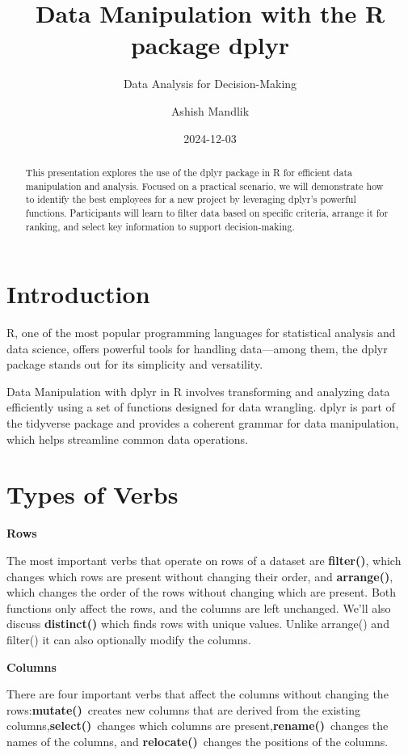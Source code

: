 \documentclass[
  11pt,
  a4paper]{article}
\title{Data Manipulation with the R package dplyr}
\subtitle{Data Analysis for Decision-Making}
\author{Ashish Mandlik}
\date{2024-12-03}
\begin{document}
\maketitle
\begin{abstract}
This presentation explores the use of the dplyr package in R for
efficient data manipulation and analysis. Focused on a practical
scenario, we will demonstrate how to identify the best employees for a
new project by leveraging dplyr's powerful functions. Participants will
learn to filter data based on specific criteria, arrange it for ranking,
and select key information to support decision-making.
\end{abstract}


\section{Introduction}\label{introduction}

R, one of the most popular programming languages for statistical
analysis and data science, offers powerful tools for handling
data---among them, the dplyr package stands out for its simplicity and
versatility.

Data Manipulation with dplyr in R involves transforming and analyzing
data efficiently using a set of functions designed for data wrangling.
dplyr is part of the tidyverse package and provides a coherent grammar
for data manipulation, which helps streamline common data operations.

\section{Types of Verbs}\label{types-of-verbs}

\textbf{Rows}

The most important verbs that operate on rows of a dataset are
\textbf{filter()}, which changes which rows are present without changing
their order, and \textbf{arrange()}, which changes the order of the rows
without changing which are present. Both functions only affect the rows,
and the columns are left unchanged. We'll also discuss
\textbf{distinct()} which finds rows with unique values. Unlike
arrange() and filter() it can also optionally modify the columns.

\textbf{Columns}

There are four important verbs that affect the columns without changing
the rows:\textbf{mutate()}~creates new columns that are derived from the
existing columns,\textbf{select()}~changes which columns are
present,\textbf{rename()}~changes the names of the columns, and
\textbf{relocate()}~changes the positions of the columns.
\end{document}
